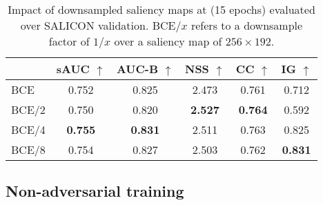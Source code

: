 \documentclass[times,twocolumn,final,authoryear]{elsarticle}
\begin{document}
\begin{table}
\begin{center}
\begin{tabular}{lccccc}
\hline
 			& sAUC $\uparrow$ 			& AUC-B $\uparrow$		& NSS $\uparrow$ 	& CC $\uparrow$ 		& IG $\uparrow$\\
\hline 
BCE 		& 0.752					& 0.825						& 2.473				& 0.761  				& 0.712 \\
BCE/2 		& 0.750					& 0.820						& \textbf{2.527}	& \textbf{0.764} 		& 0.592 \\
BCE/4 		& \textbf{0.755}		& \textbf{0.831}			& 2.511				& 0.763 				& 0.825 \\
BCE/8 		& 0.754					& 0.827						& 2.503				& 0.762 				& \textbf{0.831}\\
\hline
\end{tabular}
\end{center}
\caption{Impact of downsampled saliency maps at (15 epochs) evaluated over SALICON validation. BCE/$x$ refers to a downsample factor of $1/x$ over a saliency map of $256 \times 192$.}
\label{tab:Downsample15}
\end{table}


\subsection{Non-adversarial training}
\label{ssec:ContentLossExp}
\end{document}
